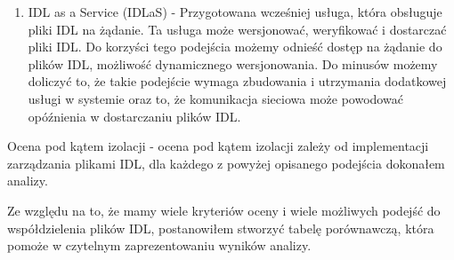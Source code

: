 \documentclass[runningheads,12pt]{llncs}
\begin{document}
\begin{enumerate}
    \item IDL as a Service (IDLaS) - Przygotowana wcześniej usługa, która obsługuje pliki IDL na żądanie. Ta usługa może wersjonować, weryfikować i dostarczać pliki IDL. Do korzyści tego podejścia możemy odnieść dostęp na żądanie do plików IDL, możliwość dynamicznego wersjonowania. Do minusów możemy doliczyć to, że takie podejście wymaga zbudowania i utrzymania dodatkowej usługi w systemie oraz to, że komunikacja sieciowa może powodować opóźnienia w dostarczaniu plików IDL.
\end{enumerate}

Ocena pod kątem izolacji - ocena pod kątem izolacji zależy od implementacji zarządzania plikami IDL, dla każdego z powyżej opisanego podejścia dokonałem analizy.

Ze względu na to, że mamy wiele kryteriów oceny i wiele możliwych podejść do współdzielenia plików IDL, postanowiłem stworzyć tabelę porównawczą, która pomoże w czytelnym zaprezentowaniu wyników analizy.
\end{document}

